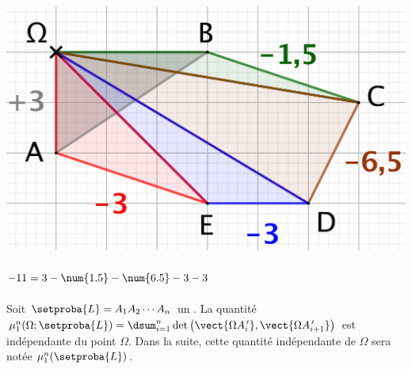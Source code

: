\begin{multicols}{2}
\begin{center}
        \includegraphics[scale=.35]{content/polygon/alg-area/convex-2.png}

       	\smallskip

		$- 11 = 3 - \num{1.5} - \num{6.5} - 3 - 3 \vphantom{\dfrac{2^M}2}$
    \end{center}
\end{multicols}




\begin{fact} \label{sarea-pt-ct}
    Soit $\setproba{L} = A_1 A_2 \cdots A_n$ un \ncycle.
    La quantité
    $\mu_1^n (\Omega ;\setproba{L}) = \dsum_{i=1}^{n} \det \big( \vect{\Omega \primeit{A}_i} , \vect{\Omega \primeit{A}_{i+1}} \big)$ 
    est indépendante du point $\Omega$.
    Dans la suite, cette quantité indépendante de $\Omega$ sera notée $\mu_1^n (\setproba{L})$.
\end{fact}



